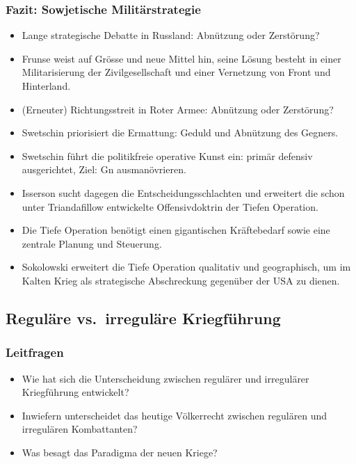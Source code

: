 {}\documentclass[a4paper]{article}
\providecommand{\tightlist}{\setlength{\itemsep}{1mm}\setlength{\parskip}{1mm}}
\begin{document}
\subsubsection{Fazit: Sowjetische
	Militärstrategie}\label{fazit-sowjetische-milituxe4rstrategie}

\begin{itemize}
	\tightlist
	\item
	      Lange strategische Debatte in Russland: Abnützung oder Zerstörung?
	\item
	      Frunse weist auf Grösse und neue Mittel hin, seine Lösung besteht in
	      einer Militarisierung der Zivilgesellschaft und einer Vernetzung von
	      Front und Hinterland.
	\item
	      (Erneuter) Richtungsstreit in Roter Armee: Abnützung oder Zerstörung?
	\item
	      Swetschin priorisiert die Ermattung: Geduld und Abnützung des Gegners.
	\item
	      Swetschin führt die politikfreie operative Kunst ein: primär defensiv
	      ausgerichtet, Ziel: Gn ausmanövrieren.
	\item
	      Isserson sucht dagegen die Entscheidungsschlachten und erweitert die
	      schon unter Triandafillow entwickelte Offensivdoktrin der Tiefen
	      Operation.
	\item
	      Die Tiefe Operation benötigt einen gigantischen Kräftebedarf sowie
	      eine zentrale Planung und Steuerung.
	\item
	      Sokolowski erweitert die Tiefe Operation qualitativ und geographisch,
	      um im Kalten Krieg als strategische Abschreckung gegenüber der USA zu
	      dienen.
\end{itemize}

\subsection{Reguläre vs.~irreguläre
	Kriegführung}\label{reguluxe4re-vs.-irreguluxe4re-kriegfuxfchrung}

\subsubsection{Leitfragen}\label{leitfragen-3}

\begin{itemize}
	\tightlist
	\item
	      Wie hat sich die Unterscheidung zwischen regulärer und irregulärer
	      Kriegführung entwickelt?
	\item
	      Inwiefern unterscheidet das heutige Völkerrecht zwischen regulären und
	      irregulären Kombattanten?
	\item
	      Was besagt das Paradigma der neuen Kriege?
\end{itemize}
\end{document}

